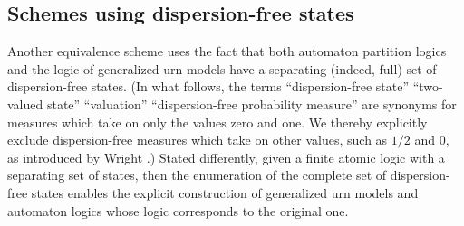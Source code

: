 \subsection{Schemes using dispersion-free states}

Another equivalence scheme  uses the fact that both
automaton partition logics and the logic of generalized urn models
have a separating (indeed, full) set of
dispersion-free states.
(In what follows, the terms
``dispersion-free state''
``two-valued state''
``valuation''
``dispersion-free probability measure''
are  synonyms for measures which take on only the values zero and one.
We thereby explicitly exclude dispersion-free measures which take on other values, such as
$1/2$ and $0$, as introduced by Wright \cite{wright:pent}.)
Stated differently, given a finite atomic logic with a separating set of states, then
the enumeration of the complete set of dispersion-free states enables
the explicit construction of  generalized urn models and automaton logics
whose logic corresponds to the original one.

